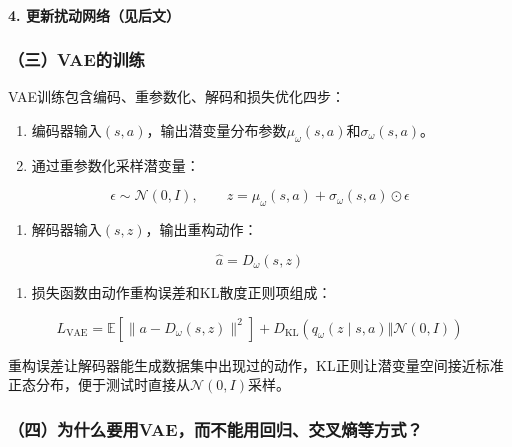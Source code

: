 \hypertarget{ux66f4ux65b0ux6270ux52a8ux7f51ux7edcux89c1ux540eux6587}{%
\paragraph{4. 更新扰动网络（见后文）}\label{ux66f4ux65b0ux6270ux52a8ux7f51ux7edcux89c1ux540eux6587}}

\hypertarget{ux4e09vaeux7684ux8badux7ec3}{%
\subsubsection{（三）VAE的训练}\label{ux4e09vaeux7684ux8badux7ec3}}

VAE训练包含编码、重参数化、解码和损失优化四步：

\begin{enumerate}
\def\labelenumi{\arabic{enumi}.}
\tightlist
\item
  编码器输入\((s,a)\)，输出潜变量分布参数\(\mu_\omega(s,a)\)和\(\sigma_\omega(s,a)\)。
\item
  通过重参数化采样潜变量：
\end{enumerate}

\[
\epsilon \sim \mathcal{N}(0,I), \qquad z=\mu_\omega(s,a)+\sigma_\omega(s,a)\odot\epsilon
\]

\begin{enumerate}
\def\labelenumi{\arabic{enumi}.}
\setcounter{enumi}{2}
\tightlist
\item
  解码器输入\((s,z)\)，输出重构动作：
\end{enumerate}

\[
\hat a = D_\omega(s,z)
\]

\begin{enumerate}
\def\labelenumi{\arabic{enumi}.}
\setcounter{enumi}{3}
\tightlist
\item
  损失函数由动作重构误差和KL散度正则项组成：
\end{enumerate}

\[
L_{\mathrm{VAE}}
=\mathbb{E}[\lVert a-D_\omega(s,z)\rVert^{2}]
+ D_{\mathrm{KL}}(q_\omega(z\mid s,a)\Vert \mathcal{N}(0,I))
\]

重构误差让解码器能生成数据集中出现过的动作，KL正则让潜变量空间接近标准正态分布，便于测试时直接从\(\mathcal{N}(0,I)\)采样。

\hypertarget{ux56dbux4e3aux4ec0ux4e48ux8981ux7528vaeux800cux4e0dux80fdux7528ux56deux5f52ux4ea4ux53c9ux71b5ux7b49ux65b9ux5f0f}{%
\subsubsection{（四）为什么要用VAE，而不能用回归、交叉熵等方式？}\label{ux56dbux4e3aux4ec0ux4e48ux8981ux7528vaeux800cux4e0dux80fdux7528ux56deux5f52ux4ea4ux53c9ux71b5ux7b49ux65b9ux5f0f}}

